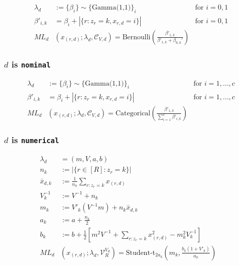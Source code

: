 \documentclass{article}
\newcommand{\iV}{\mathit{V}}
\newcommand{\set}[1]{\{{#1}\}}
\begin{document}
\begin{align*}
  \lambda_d &:= \set{\beta_i} 
              \sim \set{\text{Gamma(1,1)}}_i & 
              \text{for } i=0,1
\\
  \beta'_{i,k} &= \beta_i + 
                 |\set{r: z_r=k, x_{r,d}=i}| &
                 \text{for } i=0,1 
\\
  ML_d&(x_{(r,d)}; \lambda_d, \mathcal{C}_{\iV,d}) 
        = \text{Bernoulli}\left(
        \frac{\beta'_{1,k}}{\beta'_{1,k}+\beta_{0,k}'}
        \right) &  
\end{align*}

\subsubsection{$d$ is \texttt{nominal}}

\begin{align*}
  \lambda_d &:= \set{\beta_i} 
              \sim \set{\text{Gamma(1,1)}}_i & 
              \text{for } i=1,\ldots, c
\\
  \beta'_{i,k} &= \beta_i + 
                 |\set{r: z_r=k, x_{r,d}=i}| &
                 \text{for } i=1,\ldots, c
\\
  ML_d&(x_{(r,d)}; \lambda_d, \mathcal{C}_{\iV,d}) 
        = \text{Categorical}\left(
        \frac{\beta'_{1,k}}{\sum_{i=1}^c \beta'_{i,k}}
        \right) &
\end{align*}

\subsubsection{$d$ is \texttt{numerical}}

\begin{align*}
  \lambda_d &= (m, V, a, b) & 
\\
  n_k &:= |\set{r \in [R]: z_r = k}| 
\\
  \bar{x}_{d,k} &:= \frac{1}{n_k}\sum_{r: z_r = k}x_{(r, d)} & 
\\
  V_k^{-1} &:= V^{-1} + n_k & 
\\
  m_k &:= V'_k(V^{-1}m) + n_k\bar{x}_{d,k} &
\\
  a_k &:= a + \frac{n_k}{2} & 
\\
  b_k &:= b + \frac{1}{2} 
         \left[m^2 V^{-1} + \sum_{r: z_r = k} x^{2}_{(r, d)} -m_k^2 V_k^{-1} \right]& 
\\
  ML_d&(x_{(r,d)}; \lambda_d, \mathcal{V}_R^{\iV_d}) = 
        \text{Student-t}_{2a_k}
        \left(m_k, \frac{b_k(1+V'_k)}{a_k}\right) &
\end{align*}
\end{document}
